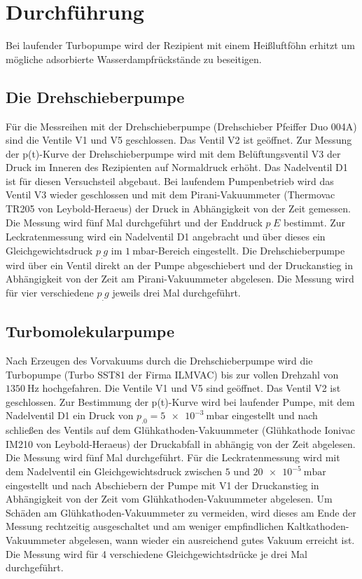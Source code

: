 \section{Durchführung}
\label{sec:Durchführung}

Bei laufender Turbopumpe wird der Rezipient mit einem Heißluftföhn erhitzt um mögliche adsorbierte Wasserdampfrückstände zu beseitigen.

\subsection{Die Drehschieberpumpe}

Für die Messreihen mit der Drehschieberpumpe (Drehschieber Pfeiffer Duo 004A) sind die Ventile V1 und V5 geschlossen. Das Ventil V2 ist geöffnet.
Zur Messung der p(t)-Kurve der Drehschieberpumpe wird mit dem Belüftungsventil V3 der Druck im Inneren des Rezipienten auf Normaldruck erhöht. Das Nadelventil D1 ist für diesen Versuchsteil abgebaut. Bei laufendem Pumpenbetrieb wird das Ventil V3 wieder geschlossen und mit dem Pirani-Vakuummeter (Thermovac TR205 von Leybold-Heraeus) der Druck in Abhängigkeit von der Zeit gemessen.
Die Messung wird fünf Mal durchgeführt und der Enddruck $p_.E$ bestimmt.\newline
Zur Leckratenmessung wird ein Nadelventil D1 angebracht und über dieses ein Gleichgewichtsdruck $p_.g$ im $\SI{1}{\milli\bar}$-Bereich eingestellt. Die Drehschieberpumpe wird über ein Ventil direkt an der Pumpe abgeschiebert und der Druckanstieg in Abhängigkeit von der Zeit am Pirani-Vakuummeter abgelesen.
Die Messung wird für vier verschiedene $p_.g$ jeweils drei Mal durchgeführt.

\subsection{Turbomolekularpumpe}

Nach Erzeugen des Vorvakuums durch die Drehschieberpumpe wird die Turbopumpe (Turbo SST81 der Firma ILMVAC) bis zur vollen Drehzahl von $\SI{1350}{\hertz}$ hochgefahren.
Die Ventile V1 und V5 sind geöffnet. Das Ventil V2 ist geschlossen.
Zur Bestimmung der p(t)-Kurve wird bei laufender Pumpe, mit dem Nadelventil D1 ein Druck von $p_.0=\SI{5e-3}{\milli\bar}$ eingestellt und nach schließen des Ventils auf dem Glühkathoden-Vakuummeter (Glühkathode Ionivac IM210 von Leybold-Heraeus) der Druckabfall in abhängig von der Zeit abgelesen. Die Messung wird fünf Mal durchgeführt.\newline
Für die Leckratenmessung wird mit dem Nadelventil ein Gleichgewichtsdruck zwischen $5$ und $\SI{20e-5}{\milli\bar}$ eingestellt und nach Abschiebern der Pumpe mit V1 der Druckanstieg in Abhängigkeit von der Zeit vom Glühkathoden-Vakuummeter abgelesen. Um Schäden am Glühkathoden-Vakuummeter zu vermeiden, wird dieses am Ende der Messung rechtzeitig ausgeschaltet und am weniger empfindlichen Kaltkathoden-Vakuummeter abgelesen, wann wieder ein ausreichend gutes Vakuum erreicht ist. Die Messung wird für 4 verschiedene Gleichgewichtsdrücke je drei Mal durchgeführt.


